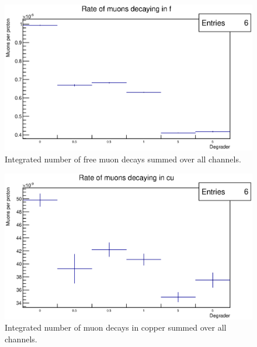 
\begin{figure}[hptb]
  \centering
    \includegraphics[width=.9\textwidth]{images/momentum_spectrum/run_muon_rate_in_f.eps}
  \caption{Integrated number of free muon decays summed over all channels.}
  \label{fig:images_momentum_spectrum_run_muon_rate_in_f}
\end{figure}

\begin{figure}[hptb]
  \centering
    \includegraphics[width=.9\textwidth]{images/momentum_spectrum/run_muon_rate_in_cu.eps}
  \caption{Integrated number of muon decays in copper summed over all channels.}
  \label{fig:images_momentum_spectrum_run_muon_rate_in_cu}
\end{figure}


